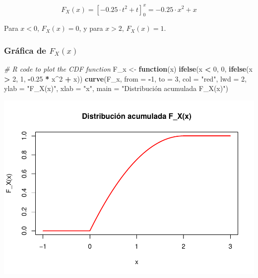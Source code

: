\documentclass[
]{article}
\newenvironment{Shaded}{\begin{snugshade}}{\end{snugshade}}
\newcommand{\AttributeTok}[1]{\textcolor[rgb]{0.13,0.29,0.53}{#1}}
\newcommand{\CommentTok}[1]{\textcolor[rgb]{0.56,0.35,0.01}{\textit{#1}}}
\newcommand{\ControlFlowTok}[1]{\textcolor[rgb]{0.13,0.29,0.53}{\textbf{#1}}}
\newcommand{\DecValTok}[1]{\textcolor[rgb]{0.00,0.00,0.81}{#1}}
\newcommand{\FloatTok}[1]{\textcolor[rgb]{0.00,0.00,0.81}{#1}}
\newcommand{\FunctionTok}[1]{\textcolor[rgb]{0.13,0.29,0.53}{\textbf{#1}}}
\newcommand{\NormalTok}[1]{#1}
\newcommand{\OtherTok}[1]{\textcolor[rgb]{0.56,0.35,0.01}{#1}}
\newcommand{\SpecialCharTok}[1]{\textcolor[rgb]{0.81,0.36,0.00}{\textbf{#1}}}
\newcommand{\StringTok}[1]{\textcolor[rgb]{0.31,0.60,0.02}{#1}}
\begin{document}
\[
F_X(x) = \left[-0.25 \cdot t^2 + t\right]_0^x = -0.25 \cdot x^2 + x
\]

Para \(x < 0\), \(F_X(x) = 0\), y para \(x > 2\), \(F_X(x) = 1\).

\subsubsection{\texorpdfstring{Gráfica de \(F_X(x)\)}{Gráfica de F\_X(x)}}\label{gruxe1fica-de-f_xx-1}

\begin{Shaded}
\begin{Highlighting}[]
\CommentTok{\# R code to plot the CDF function}
\NormalTok{F\_x }\OtherTok{\textless{}{-}} \ControlFlowTok{function}\NormalTok{(x) }\FunctionTok{ifelse}\NormalTok{(x }\SpecialCharTok{\textless{}} \DecValTok{0}\NormalTok{, }\DecValTok{0}\NormalTok{, }\FunctionTok{ifelse}\NormalTok{(x }\SpecialCharTok{\textgreater{}} \DecValTok{2}\NormalTok{, }\DecValTok{1}\NormalTok{, }\SpecialCharTok{{-}}\FloatTok{0.25} \SpecialCharTok{*}\NormalTok{ x}\SpecialCharTok{\^{}}\DecValTok{2} \SpecialCharTok{+}\NormalTok{ x))}
\FunctionTok{curve}\NormalTok{(F\_x, }\AttributeTok{from =} \SpecialCharTok{{-}}\DecValTok{1}\NormalTok{, }\AttributeTok{to =} \DecValTok{3}\NormalTok{, }\AttributeTok{col =} \StringTok{"red"}\NormalTok{, }\AttributeTok{lwd =} \DecValTok{2}\NormalTok{, }\AttributeTok{ylab =} \StringTok{"F\_X(x)"}\NormalTok{, }\AttributeTok{xlab =} \StringTok{"x"}\NormalTok{,}
      \AttributeTok{main =} \StringTok{"Distribución acumulada F\_X(x)"}\NormalTok{)}
\end{Highlighting}
\end{Shaded}

\includegraphics{Ejercicios-de-Inferencia-Estadistica_files/figure-latex/unnamed-chunk-15-1.pdf}
\end{document}
